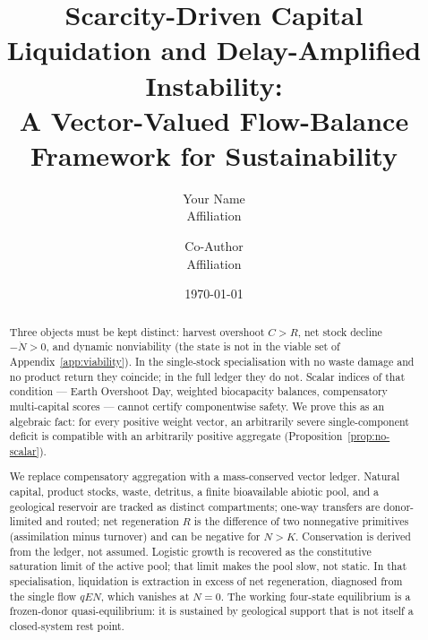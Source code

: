 \documentclass[11pt]{article}
\title{Scarcity-Driven Capital Liquidation and Delay-Amplified Instability:\\
A Vector-Valued Flow-Balance Framework for Sustainability}
\author{Your Name\\{\small Affiliation} \and Co-Author\\{\small Affiliation}}
\date{\today}
\theoremstyle{definition}
\begin{document}
\maketitle

\begin{abstract}
Three objects must be kept distinct: harvest overshoot $C>R$, net stock decline $-\dot N>0$, and dynamic nonviability (the state is not in the viable set of Appendix~\ref{app:viability}). In the single-stock specialisation with no waste damage and no product return they coincide; in the full ledger they do not. Scalar indices of that condition --- Earth Overshoot Day, weighted biocapacity balances, compensatory multi-capital scores --- cannot certify componentwise safety. We prove this as an algebraic fact: for every positive weight vector, an arbitrarily severe single-component deficit is compatible with an arbitrarily positive aggregate (Proposition~\ref{prop:no-scalar}).

We replace compensatory aggregation with a mass-conserved vector ledger. Natural capital, product stocks, waste, detritus, a finite bioavailable abiotic pool, and a geological reservoir are tracked as distinct compartments; one-way transfers are donor-limited and routed; net regeneration $R$ is the difference of two nonnegative primitives (assimilation minus turnover) and can be negative for $N>K$. Conservation is derived from the ledger, not assumed. Logistic growth is recovered as the constitutive saturation limit of the active pool; that limit makes the pool slow, not static. In that specialisation, liquidation is extraction in excess of net regeneration, diagnosed from the single flow $qEN$, which vanishes at $N=0$. The working four-state equilibrium is a frozen-donor quasi-equilibrium: it is sustained by geological support that is not itself a closed-system rest point.


\end{abstract}
\end{document}
